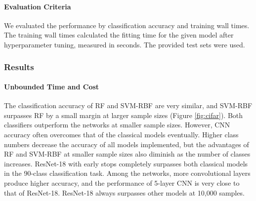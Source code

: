 \paragraph{Evaluation Criteria}
We evaluated the performance by classification accuracy and training wall times. The training wall times calculated the fitting time for the given model after hyperparameter tuning, measured in seconds. The provided test sets were used.

\subsubsection{Results}
\paragraph{Unbounded Time and Cost}
The classification accuracy of RF and SVM-RBF are very similar, and SVM-RBF surpasses RF by a small margin at larger sample sizes (Figure \ref{fig:cifar}). Both classifiers outperform the networks at smaller sample sizes. However, CNN accuracy often overcomes that of the classical models eventually. Higher class numbers decrease the accuracy of all models implemented, but the advantages of RF and SVM-RBF at smaller sample sizes also diminish as the number of classes increases. ResNet-18 with early stops completely surpasses both classical models in the 90-class classification task. Among the networks, more convolutional layers produce higher accuracy, and the performance of 5-layer CNN is very close to that of ResNet-18. ResNet-18 always surpasses other models at 10,000 samples.

